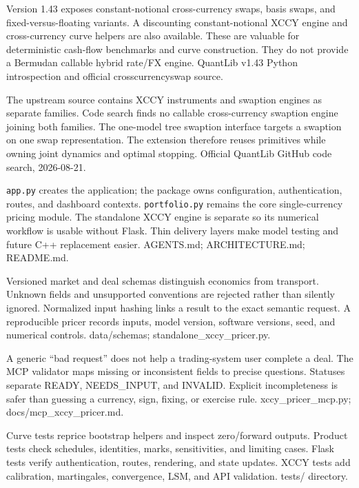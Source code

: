 {Version 1.43 exposes constant-notional cross-currency swaps, basis swaps, and fixed-versus-floating variants.}
{A discounting constant-notional XCCY engine and cross-currency curve helpers are also available.}
{These are valuable for deterministic cash-flow benchmarks and curve construction.}
{They do not provide a Bermudan callable hybrid rate/FX engine.}
{QuantLib v1.43 Python introspection and official crosscurrencyswap source.}

{The upstream source contains XCCY instruments and swaption engines as separate families.}
{Code search finds no callable cross-currency swaption engine joining both families.}
{The one-model tree swaption interface targets a swaption on one swap representation.}
{The extension therefore reuses primitives while owning joint dynamics and optimal stopping.}
{Official QuantLib GitHub code search, 2026-08-21.}

{\texttt{app.py} creates the application; the package owns configuration, authentication, routes, and dashboard contexts.}
{\texttt{portfolio.py} remains the core single-currency pricing module.}
{The standalone XCCY engine is separate so its numerical workflow is usable without Flask.}
{Thin delivery layers make model testing and future C++ replacement easier.}
{AGENTS.md; ARCHITECTURE.md; README.md.}

{Versioned market and deal schemas distinguish economics from transport.}
{Unknown fields and unsupported conventions are rejected rather than silently ignored.}
{Normalized input hashing links a result to the exact semantic request.}
{A reproducible pricer records inputs, model version, software versions, seed, and numerical controls.}
{data/schemas; standalone\_xccy\_pricer.py.}

{A generic ``bad request'' does not help a trading-system user complete a deal.}
{The MCP validator maps missing or inconsistent fields to precise questions.}
{Statuses separate READY, NEEDS\_INPUT, and INVALID.}
{Explicit incompleteness is safer than guessing a currency, sign, fixing, or exercise rule.}
{xccy\_pricer\_mcp.py; docs/mcp\_xccy\_pricer.md.}

{Curve tests reprice bootstrap helpers and inspect zero/forward outputs.}
{Product tests check schedules, identities, marks, sensitivities, and limiting cases.}
{Flask tests verify authentication, routes, rendering, and state updates.}
{XCCY tests add calibration, martingales, convergence, LSM, and API validation.}
{tests/ directory.}


